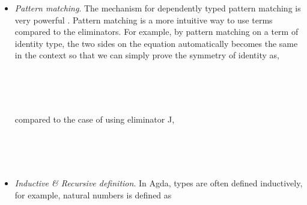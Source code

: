 \begin{itemize}
\item \textit{Pattern matching}. The mechanism for dependently typed pattern matching is very powerful \cite{alti:pisigma-new}. Pattern matching is a more intuitive way to use terms compared to the eliminators. For example, by pattern matching on a term of identity type, the two sides on the equation automatically becomes the same in the context so that we can simply prove the symmetry of identity as,

\begin{code}
\\
\> \AgdaSymbol{:} \AgdaSymbol{\{} \AgdaSymbol{:} \AgdaSymbol{\}\{}  \AgdaSymbol{:} \AgdaSymbol{\}}        \<%
\\
\>  \AgdaSymbol{=} \<%
\\
\end{code}

compared to the case of using eliminator J,

\begin{code}\label{symmetry}
\\
\> \AgdaSymbol{:} \AgdaSymbol{\{} \AgdaSymbol{:} \AgdaSymbol{\}\{}  \AgdaSymbol{:} \AgdaSymbol{\}}        \<%
\\
\> \AgdaSymbol{=}     \AgdaBound{\_}    \AgdaSymbol{)}  \AgdaBound{\_}  \AgdaSymbol{)} \AgdaSymbol{\_} \AgdaSymbol{\_}\<%
\\
\end{code}

\item \textit{Inductive \& Recursive definition}. In Agda, types are often defined inductively, for example, natural numbers is defined as

\begin{code}\>\<%
\>  \AgdaSymbol{:}  \<%
\\
\>[0]\<[2]%
\>[2] \AgdaSymbol{:} \<%
\\
\>[0]\<[2]%
\>[2] \<[7]%
\>[7]\AgdaSymbol{:} \AgdaSymbol{(} \AgdaSymbol{:} \AgdaSymbol{)}  \<%
\>\<\end{code}


\end{itemize}
